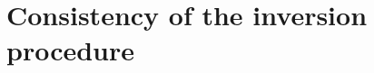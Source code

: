 \documentclass{article}
\newcommand{\NN}{\mathbb{N}}
\newcommand{\PP}{\mathbb{P}}
\newcommand{\blank}{{\mspace{2mu}\cdot\mspace{2mu}}}
\theoremstyle{plain}
\theoremstyle{remark}
\theoremstyle{definition}
\begin{document}
\section{Consistency of the inversion procedure}\label{inversion_sufficient_conditions_section}
\end{document}
